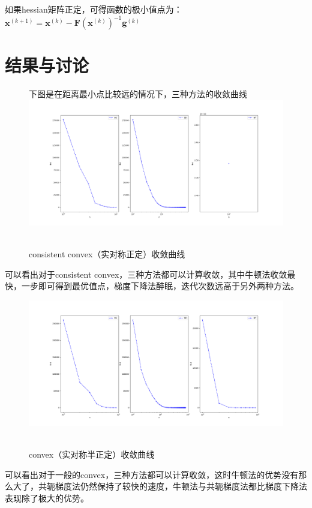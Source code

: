 \documentclass[UTF8]{ctexart}
\begin{document}
如果hessian矩阵正定，可得函数的极小值点为：
$\boldsymbol{x}^{(k+1)}=\boldsymbol{x}^{(k)}-\boldsymbol{F}\left(\boldsymbol{x}^{(k)}\right)^{-1} \boldsymbol{g}^{(k)}$



\section{结果与讨论}

\begin{figure}[H]
下图是在距离最小点比较远的情况下，三种方法的收敛曲线
  \centering
  \label{fig:Per6A}\includegraphics[width=1\textwidth]{SDP.png}\
  \caption{consistent convex（实对称正定）收敛曲线}
  \label{fig:oscil}
\end{figure}

可以看出对于consistent convex，三种方法都可以计算收敛，其中牛顿法收敛最快，一步即可得到最优值点，梯度下降法醉眠，迭代次数远高于另外两种方法。

\begin{figure}[H]
  \centering
  \label{fig:Per6A}\includegraphics[width=1\textwidth]{SSDP.png}\
  \caption{convex（实对称半正定）收敛曲线}
  \label{fig:oscil}
\end{figure}

可以看出对于一般的convex，三种方法都可以计算收敛，这时牛顿法的优势没有那么大了，共轭梯度法仍然保持了较快的速度，牛顿法与共轭梯度法都比梯度下降法表现除了极大的优势。
\end{document}
